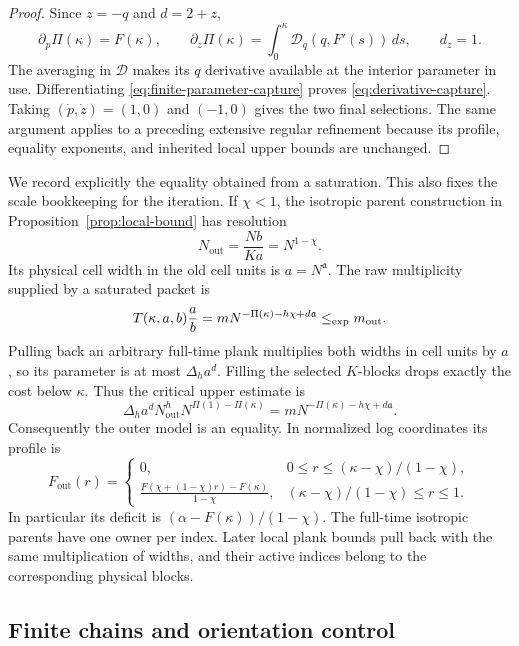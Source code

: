 \begin{proof}
Since $z=-q$ and $d=2+z$,
\[
 \partial_p\Pi(\kappa)=F(\kappa),\qquad
 \partial_z\Pi(\kappa)
   =\int_0^\kappa\mathcal D_q(q,F'(s))\,ds,
 \qquad d_z=1.
\]
The averaging in $\mathcal D$ makes its $q$ derivative available at the
interior parameter in use. Differentiating
\eqref{eq:finite-parameter-capture} proves
\eqref{eq:derivative-capture}. Taking $(\dot p,\dot z)=(1,0)$ and
$(-1,0)$ gives the two final selections. The same argument applies to a
preceding extensive regular refinement because its profile, equality
exponents, and inherited local upper bounds are unchanged.
\end{proof}

We record explicitly the equality obtained from a saturation. This also
fixes the scale bookkeeping for the iteration. If $\chi<1$, the isotropic
parent construction in Proposition~\ref{prop:local-bound} has resolution
\[
 N_{\mathrm{out}}=\frac{Nb}{Ka}=N^{1-\chi}.
\]
Its physical cell width in the old cell units is $a=N^{\mathfrak a}$.
The raw multiplicity supplied by a saturated packet is
\begin{equation}
 T(\kappa,a,b)\frac ab
 =mN^{-\Pi(\kappa)-h\chi+d\mathfrak a}
 \mathrel{\leq_{\mathrm{exp}}} m_{\mathrm{out}}.
 \label{eq:outer-multiplicity}
\end{equation}
Pulling back an arbitrary full-time plank multiplies both widths in cell
units by $a$, so its parameter is at most $\Delta_h a^d$. Filling the
selected $K$-blocks drops exactly the cost below $\kappa$. Thus the
critical upper estimate is
\[
 \Delta_h a^dN_{\mathrm{out}}^h
       N^{\Pi(1)-\Pi(\kappa)}
 =mN^{-\Pi(\kappa)-h\chi+d\mathfrak a}.
\]
Consequently the outer model is an equality. In normalized log
coordinates its profile is
\begin{equation}
 F_{\mathrm{out}}(r)=
 \begin{cases}
 0,&0\le r\le(\kappa-\chi)/(1-\chi),\\[2mm]
 \displaystyle
 \frac{F(\chi+(1-\chi)r)-F(\kappa)}{1-\chi},
    &(\kappa-\chi)/(1-\chi)\le r\le1.
 \end{cases}
 \label{eq:outer-profile}
\end{equation}
In particular its deficit is $(\alpha-F(\kappa))/(1-\chi)$.
The full-time isotropic parents have one owner per index. Later local
plank bounds pull back with the same multiplication of widths, and their
active indices belong to the corresponding physical blocks.

\subsection{Finite chains and orientation control}

